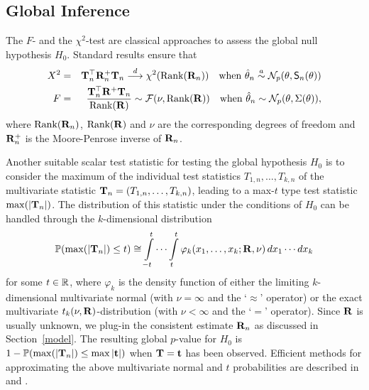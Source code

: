 \documentclass[12pt,a4paper]{article}
\begin{document}
\subsection{Global Inference}

\label{global} %

The $F$- and the $\chi^2$-test are classical approaches to assess the global
null hypothesis $H_0$. Standard results \citep[such as Theorem
3.5,][]{Serfling1980} ensure that 
\begin{eqnarray*}
X^2 & = & \T_n^\top \Cor_n^+ \T_n
\cL \chi^2(\Rg(\Cor_n)) \quad \text{when } \hat{\theta}_n \an
\N_p(\theta, \S_n(\theta)) \\
F & = & \frac{\T_n^\top \Cor^+ \T_n}{\Rg(\Cor)} \sim \F(\nu, \Rg(\Cor)) \quad \text{%
when } \hat{\theta}_n \sim \N_p(\theta, \Sigma(\theta)),
\end{eqnarray*}
where $\text{Rank}(\mathbf{R}_n)$, $\text{Rank}(\mathbf{R})$ and $\nu$ are the corresponding degrees of freedom
and $\mathbf{R}_n^+$ is the Moore-Penrose inverse of $\mathbf{R}_n$.

Another suitable scalar test statistic for testing the global hypothesis $H_0
$ is to consider the maximum of the individual test statistics $T_{1,n}, \dots,
T_{k,n}$ of the multivariate statistic $\mathbf{T}_n = (T_{1,n}, \dots, T_{k,n})$, leading to a max-$t$ type
test statistic $\max(|\mathbf{T}_n|)$. The distribution of this statistic under the
conditions of $H_0$ can be handled through the $k$-dimensional distribution 
\begin{eqnarray}  \label{maxt}
\mathbb{P}(\max(|\mathbf{T}_n|) \le t) \cong \int\limits_{-t}^t \cdots \int\limits_{t}^t
\varphi_k(x_1, \dots, x_k; \mathbf{R}, \nu) \, dx_1 \cdots dx_k
\end{eqnarray}
for some $t \in \mathbb{R}$, where $\varphi_k$ is the density function of either the
limiting $k$-dimensional multivariate normal (with $\nu = \infty$ and the `$%
\approx$' operator) or the exact multivariate $t_k(\nu, \mathbf{R})$-distribution
(with $\nu < \infty$ and the `$=$' operator). Since $\mathbf{R}$ is usually
unknown, we plug-in the consistent estimate $\mathbf{R}_n$ as discussed in
Section~\ref{model}.
The resulting global $p$-value for $H_0$ is $1 - \Prob(\max(|%
\T_n|) \le \max|\tt|)$ when $\mathbf{T} = \mathbf{t}$ has been observed. Efficient methods
for approximating the above multivariate normal and $t$ probabilities are
described in \cite{Genz1992,GenzBretz1999,BretzGenzHothorn2001} and \cite%
{GenzBretz2002}. %
\end{document}
